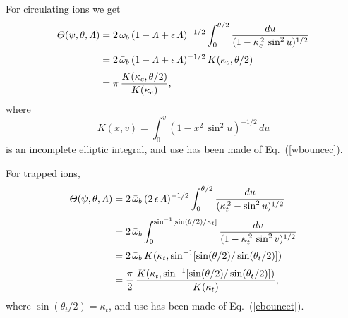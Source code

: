 \documentclass[12pt,prb,aps,notitlepage]{revtex4-1}
\begin{document}
For circulating ions we get
\begin{align}\label{e193}
{\mit\Theta}(\psi,\theta,{\mit\Lambda}) &=2\,\bar{\omega}_b\,(1-{\mit\Lambda}+\epsilon\,{\mit\Lambda})^{-1/2}\int_0^{\theta/2}\frac{du}{(1- \kappa_c^{\,2}\,\sin^2 u)^{1/2}}\nonumber\\[0.5ex]
&= 2\,\bar{\omega}_b\,(1-{\mit\Lambda}+\epsilon\,{\mit\Lambda})^{-1/2}\,K(\kappa_c,\theta/2)\nonumber\\[0.5ex]
&= \pi\,\frac{K(\kappa_c,\theta/2)}{K(\kappa_c)},
\end{align}
where
\begin{equation}
K(x,v)= \int_0^v (1-x^2\,\sin^2 u)^{-1/2}\,du
\end{equation}
is an incomplete elliptic integral, and use has been made of Eq.~(\ref{wbouncec}). 

For trapped ions, 
\begin{align}
{\mit\Theta}(\psi,\theta,{\mit\Lambda}) &= 2\,\bar{\omega}_b \,(2\,\epsilon\,{\mit\Lambda})^{-1/2}\int_0^{\theta/2}\frac{du}{(\kappa_t^{\,2}-\sin^2u)^{1/2}}\nonumber\\[0.5ex]
&= 2\,\bar{\omega}_b \int_0^{\sin^{-1}[\sin(\theta/2)/\kappa_t]}
\frac{dv}{(1-\kappa_t^{\,2}\,\sin^2v)^{1/2}}\nonumber\\[0.5ex]
&= 2\,\bar{\omega}_b \,K(\kappa_t,\sin^{-1}[\sin(\theta/2)/\sin(\theta_t/2)])\nonumber\\[0.5ex]
&= \frac{\pi}{2}\,\frac{K(\kappa_t,\sin^{-1}[\sin(\theta/2)/\sin(\theta_t/2)])}{K(\kappa_t)},
\end{align}
where $\sin(\theta_t/2)= \kappa_t$, and use has been made of Eq.~(\ref{ebouncet}). 
\end{document}
